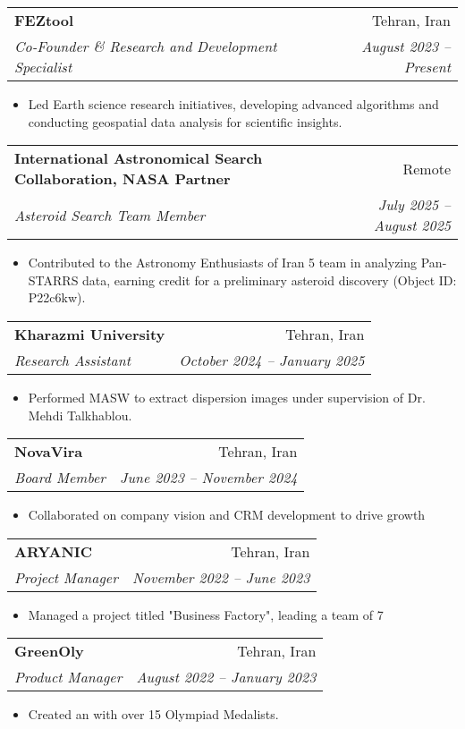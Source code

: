 \documentclass[letterpaper,11pt]{article}
\makeatletter
\newcommand{\resitem}[1]{\item #1 \vspace{-2pt}}
\newcommand{\ressubheading}[4]{%
	\begin{tabular*}{\textwidth}{l@{\cftdotfill{\cftsecdotsep}\extracolsep{\fill}}r}
		\textbf{#1} & #2 \\
		\textit{#3} & \textit{#4} \\
	\end{tabular*}\vspace{-8pt}
}
\makeatother
\begin{document}
	\vspace{-0.78em} 
	\ressubheading{FEZtool}{Tehran, Iran}{Co-Founder \& Research and Development Specialist}{August 2023 – Present}
	\begin{itemize}[topsep=7.5pt,partopsep=0pt,itemsep=3.5pt,parsep=0pt]
\resitem{Led Earth science research initiatives, developing advanced algorithms and conducting geospatial data analysis for scientific insights.}

	\end{itemize}
	\vspace{-0.50em}
	\ressubheading{International Astronomical Search Collaboration, NASA Partner}{Remote}{Asteroid Search Team Member}{July 2025 – August 2025}
\begin{itemize}[topsep=7.5pt,partopsep=0pt,itemsep=3.5pt,parsep=0pt]
    \resitem{Contributed to the Astronomy Enthusiasts of Iran 5 team in analyzing Pan-STARRS data, earning credit for a preliminary asteroid discovery (Object ID: P22c6kw).}
\end{itemize}
\vspace{-0.50em}  
	\ressubheading{Kharazmi University}{Tehran, Iran}{Research Assistant}{October 2024 – January 2025}
	\begin{itemize}[topsep=7.5pt,partopsep=0pt,itemsep=3.5pt,parsep=0pt]
		\resitem{Performed MASW to extract dispersion images under supervision of Dr. Mehdi Talkhablou.}
	\end{itemize}
	\vspace{-0.50em} 
		\ressubheading{NovaVira}{Tehran, Iran}{Board Member}{June 2023 – November 2024}
	\begin{itemize}[topsep=7.5pt,partopsep=0pt,itemsep=3.5pt,parsep=0pt]
		\resitem{Collaborated on company vision and CRM development to drive growth}
	\end{itemize}
	\vspace{-0.50em} 
	\ressubheading{ARYANIC}{Tehran, Iran}{Project Manager}{November 2022 – June 2023}
	\begin{itemize}[topsep=7.5pt,partopsep=0pt,itemsep=3.5pt,parsep=0pt]
		\resitem{Managed a project titled "Business Factory", leading a team of 7}
	\end{itemize}
	\vspace{-0.50em} 
	\ressubheading{GreenOly}{Tehran, Iran}{Product Manager}{August 2022 – January 2023}
	\begin{itemize}[topsep=7.5pt,partopsep=0pt,itemsep=3.5pt,parsep=0pt]
		\resitem{Created an
			\href{https://aradfarahani.com/MOOC/}{\dotuline{Entrepreneurship MOOC}} with over 15 Olympiad Medalists.}
		
	\end{itemize}
	\vspace{+1.1em} 
\end{document}
